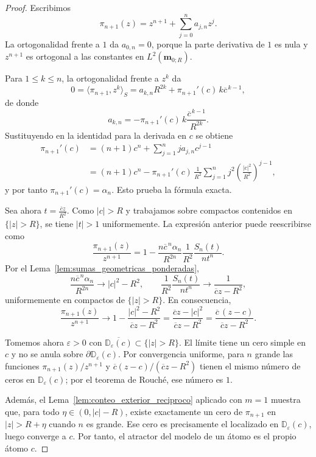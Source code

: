 \begin{proof}
	Escribimos
	\[
		\pi_{n+1}(z)=z^{n+1}+\sum_{j=0}^n a_{j,n}z^j.
	\]
	La ortogonalidad frente a $1$ da $a_{0,n}=0$, porque la parte derivativa de $1$ es nula y $z^{n+1}$ es ortogonal a las constantes en $L^2(\mathbf m_{0;R})$.

	Para $1\le k\le n$, la ortogonalidad frente a $z^k$ da
	\[
		0=\langle \pi_{n+1},z^k\rangle_S
		=a_{k,n}R^{2k}+\pi_{n+1}'(c)\,k\overline c^{\,k-1},
	\]
	de donde
	\[
		a_{k,n}=-\pi_{n+1}'(c)\,k\frac{\overline c^{\,k-1}}{R^{2k}}.
	\]
	Sustituyendo en la identidad para la derivada en $c$ se obtiene
	\begin{align*}
		\pi_{n+1}'(c)
		 & =(n+1)c^n+\sum_{j=1}^n j a_{j,n}c^{j-1} \\
		 & =(n+1)c^n-\pi_{n+1}'(c)\,\frac1{R^2}
		\sum_{j=1}^n j^2\left(\frac{|c|^2}{R^2}\right)^{j-1},
	\end{align*}
	y por tanto $\pi_{n+1}'(c)=\alpha_n$. Esto prueba la fórmula exacta.

	Sea ahora $t=\frac{\overline c z}{R^2}$.
	Como $|c|>R$ y trabajamos sobre compactos contenidos en $\{|z|>R\}$, se tiene $|t|>1$ uniformemente. La expresión anterior puede reescribirse como
	\[
		\frac{\pi_{n+1}(z)}{z^{n+1}}
		=
		1-
		\frac{n\overline c^{\,n}\alpha_n}{R^{2n}}
		\frac{1}{R^2}
		\frac{S_n(t)}{nt^n}.
	\]
	Por el Lema~\ref{lem:sumas_geometricas_ponderadas},
	\[
		\frac{n\overline c^{\,n}\alpha_n}{R^{2n}}
		\longrightarrow |c|^2-R^2,
		\qquad
		\frac{1}{R^2}\frac{S_n(t)}{nt^n}\longrightarrow \frac{1}{\overline c z-R^2},
	\]
	uniformemente en compactos de $\{|z|>R\}$. En consecuencia,
	\[
		\frac{\pi_{n+1}(z)}{z^{n+1}}
		\longrightarrow
		1-\frac{|c|^2-R^2}{\overline c z-R^2}
		=
		\frac{\overline c z-|c|^2}{\overline c z-R^2}
		=
		\frac{\overline c\,(z-c)}{\overline c z-R^2}.
	\]

	Tomemos ahora $\varepsilon>0$ con $\overline{\mathbb D_\varepsilon(c)}\subset\{|z|>R\}$. El límite tiene un cero simple en $c$ y no se anula sobre $\partial\mathbb D_\varepsilon(c)$. Por convergencia uniforme, para $n$ grande las funciones $\pi_{n+1}(z)/z^{n+1}$ y $\overline c(z-c)/(\overline c z-R^2)$ tienen el mismo número de ceros en $\mathbb D_\varepsilon(c)$; por el teorema de Rouché, ese número es $1$.

	Además, el Lema~\ref{lem:conteo_exterior_reciproco} aplicado con $m=1$ muestra que, para todo $\eta\in(0,|c|-R)$, existe exactamente un cero de $\pi_{n+1}$ en $|z|>R+\eta$ cuando $n$ es grande. Ese cero es precisamente el localizado en $\mathbb D_\varepsilon(c)$, luego converge a $c$. Por tanto, el atractor del modelo de un átomo es el propio átomo $c$.
\end{proof}

